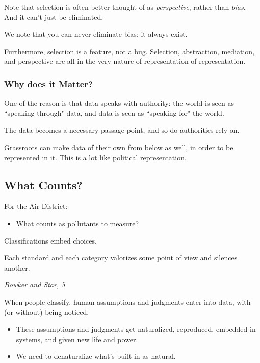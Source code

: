\documentclass[openany]{book}
\begin{document}
\begin{warn}
	Note that selection is often better thought of as \textit{perspective}, rather than \textit{bias}. And it can't just be eliminated.
\end{warn}

We note that you can never eliminate bias; it always exist.

Furthermore, selection is a feature, not a bug. Selection, abstraction, mediation, and perspective are all in the very nature of representation of representation.

\subsubsection{Why does it Matter?}
One of the reason is that data speaks with authority: the world is seen as ``speaking through" data, and data is seen as ``speaking for" the world.

The data becomes a necessary passage point, and so do authorities rely on.

Grassroots can make data of their own from below as well, in order to be represented in it. This is a lot like political representation.

\subsection{What Counts?}
For the Air District:
\begin{itemize}
	\item What counts as pollutants to measure?
\end{itemize}

Classifications embed choices.

\begin{fancyquotes}
	Each standard and each category valorizes some point of view and silences another.
	
	\begin{flushright}
		\emph{Bowker and Star, 5}
	\end{flushright}
\end{fancyquotes}

When people classify, human assumptions and judgments enter into data, with (or without) being noticed.
\begin{itemize}
	\item These assumptions and judgments get naturalized, reproduced, embedded in systems, and given new life and power.
	\item We need to denaturalize what's built in as natural.
\end{itemize}
\end{document}
